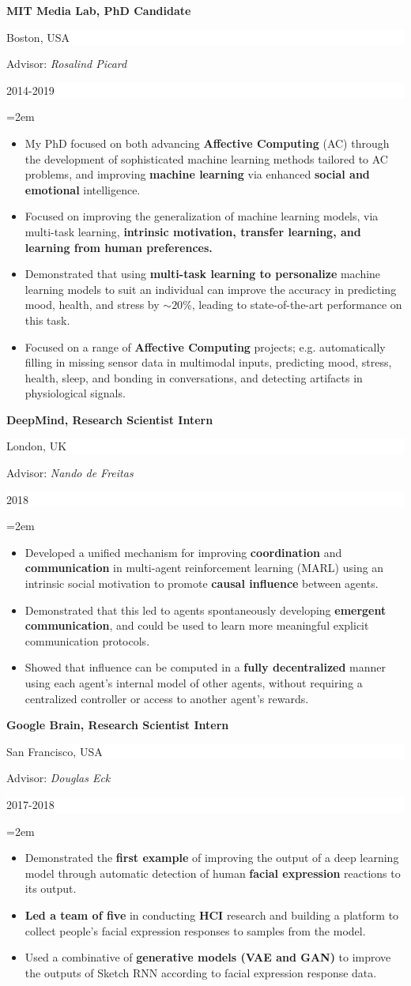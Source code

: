 \documentclass[paper=letter,fontsize=11pt]{scrartcl} %
\newcommand{\sepspace}{\vspace*{1em}}        %
\newcommand{\ResearchEntry}[5]{
        \noindent \textbf{#1} \hfill      %
        \colorbox{White}{%
            \parbox{10em}{%
            \hfill\color{Black}#2}} \par  %
        \noindent Advisor: \textit{#3} \hfill      %
        \colorbox{White}{%
            \parbox{6em}{%
            \hfill\color{Black}#4}} \par  %
        \noindent\hangindent=2em\hangafter=0 \small #5 %
        \normalsize \par}
\begin{document}
\ResearchEntry{MIT Media Lab, PhD Candidate}{Boston, USA}{Rosalind Picard}{2014-2019}
{\begin{itemize}
    \item My PhD focused on both advancing \textbf{Affective Computing} (AC) through the development of sophisticated machine learning methods tailored to AC problems, and improving \textbf{machine learning} via enhanced \textbf{social and emotional} intelligence. 
    \item Focused on improving the generalization of machine learning models, via multi-task learning, \textbf{intrinsic motivation, transfer learning, and learning from human preferences.}
    \item Demonstrated that using \textbf{multi-task learning to personalize} machine learning models to suit an individual can improve the accuracy in predicting mood, health, and stress by $\sim20$\%, leading to state-of-the-art performance on this task.
    \item Focused on a range of \textbf{Affective Computing} projects; e.g. automatically filling in missing sensor data in multimodal inputs, predicting mood, stress, health, sleep, and bonding in conversations, and detecting artifacts in physiological signals.
\end{itemize}}
\sepspace

\ResearchEntry{DeepMind, Research Scientist Intern}{London, UK}{Nando de Freitas}{2018}
{\begin{itemize}
    \item Developed a unified mechanism for improving \textbf{coordination} and \textbf{communication} in multi-agent reinforcement learning (MARL) using an intrinsic social motivation to promote \textbf{causal influence} between agents.
    \item Demonstrated that this led to agents spontaneously developing \textbf{emergent communication}, and could be used to learn more meaningful explicit communication protocols. 
    \item Showed that influence can be computed in a \textbf{fully decentralized} manner using each agent's internal model of other agents, without requiring a centralized controller or access to another agent's rewards.
\end{itemize}}
\sepspace

\ResearchEntry{Google Brain, Research Scientist Intern}{San Francisco, USA}{Douglas Eck}{2017-2018}
{\begin{itemize}
    \item Demonstrated the \textbf{first example} of improving the output of a deep learning model through automatic detection of human \textbf{facial expression} reactions to its output.
    \item \textbf{Led a team of five} in conducting \textbf{HCI} research and building a platform to collect people's facial expression responses to samples from the model. 
    \item Used a combinative of \textbf{generative models (VAE and GAN)} to improve the outputs of Sketch RNN according to facial expression response data. 
\end{itemize}}
\sepspace
\end{document}
